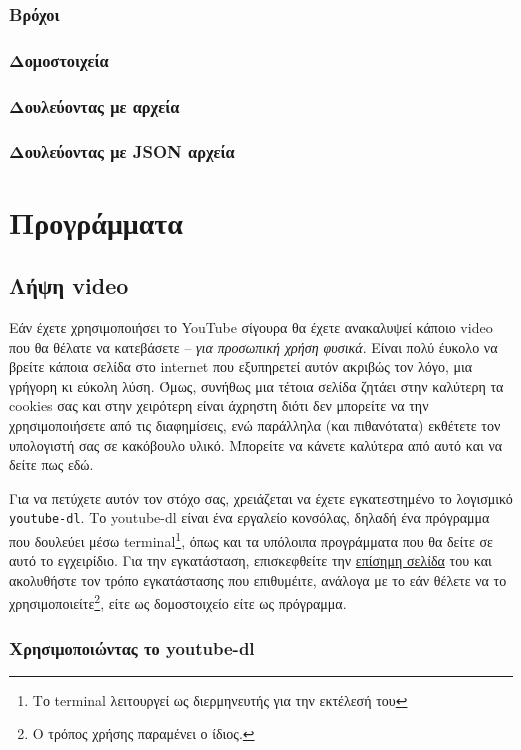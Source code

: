 \documentclass[14pt]{extreport}
\begin{document}
\subsection{Βρόχοι}
\subsection{Δομοστοιχεία}
\subsection{Δουλεύοντας με αρχεία}
\subsection{Δουλεύοντας με JSON αρχεία}

\chapter{Προγράμματα}
\newpage

\section{Λήψη video}
Εάν έχετε χρησιμοποιήσει το YouTube σίγουρα θα έχετε ανακαλυψεί κάποιο video που θα θέλατε να κατεβάσετε -- \textit{για προσωπική χρήση φυσικά}. Είναι πολύ έυκολο να βρείτε κάποια σελίδα στο internet που εξυπηρετεί αυτόν ακριβώς τον λόγο, μια γρήγορη κι εύκολη λύση. Όμως, συνήθως μια τέτοια σελίδα ζητάει στην καλύτερη τα cookies σας και στην χειρότερη είναι άχρηστη διότι δεν μπορείτε να την χρησιμοποιήσετε από τις διαφημίσεις, ενώ παράλληλα (και πιθανότατα) εκθέτετε τον υπολογιστή σας σε κακόβουλο υλικό. Μπορείτε να κάνετε καλύτερα από αυτό και να δείτε πως εδώ.

Για να πετύχετε αυτόν τον στόχο σας, χρειάζεται να έχετε εγκατεστημένο το λογισμικό \lstinline{youtube-dl}. Το youtube-dl είναι ένα εργαλείο κονσόλας, δηλαδή ένα πρόγραμμα που δουλεύει μέσω terminal\footnote{Το terminal λειτουργεί ως διερμηνευτής για την εκτέλεσή του}, όπως και τα υπόλοιπα προγράμματα που θα δείτε σε αυτό το εγχειρίδιο. Για την εγκατάσταση, επισκεφθείτε την \href{https://github.com/ytdl-org/youtube-dl#installation}{επίσημη σελίδα} του και ακολυθήστε τον τρόπο εγκατάστασης που επιθυμέιτε, ανάλογα με το εάν θέλετε να το χρησιμοποιείτε\footnote{Ο τρόπος χρήσης παραμένει ο ίδιος.}, είτε ως δομοστοιχείο είτε ως πρόγραμμα.

\subsection{Χρησιμοποιώντας το youtube-dl}
\end{document}
